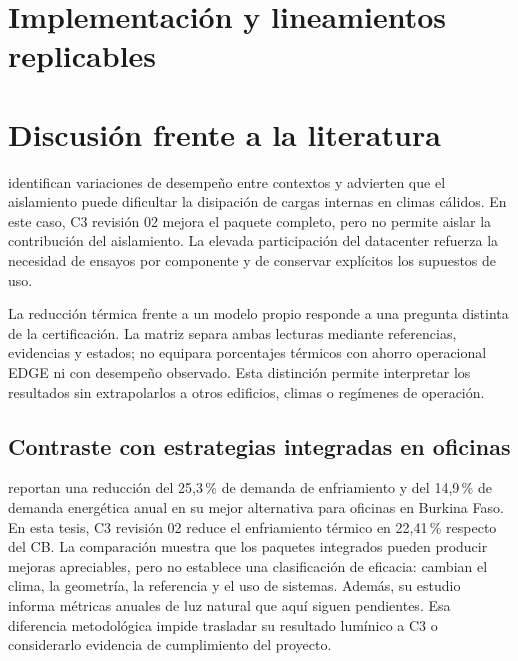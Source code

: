 \section{Implementación y lineamientos replicables}


\section{Discusión frente a la literatura}
\textcite{ribeiroLEEDCertificationBuilding} identifican variaciones de desempeño entre contextos y advierten que el aislamiento puede dificultar la disipación de cargas internas en climas cálidos. En este caso, C3 revisión 02 mejora el paquete completo, pero no permite aislar la contribución del aislamiento. La elevada participación del datacenter refuerza la necesidad de ensayos por componente y de conservar explícitos los supuestos de uso.

La reducción térmica frente a un modelo propio responde a una pregunta distinta de la certificación. La matriz separa ambas lecturas mediante referencias, evidencias y estados; no equipara porcentajes térmicos con ahorro operacional EDGE ni con desempeño observado. Esta distinción permite interpretar los resultados sin extrapolarlos a otros edificios, climas o regímenes de operación.

\subsection{Contraste con estrategias integradas en oficinas}
\textcite{zoureImplementingNaturalVentilation2023a} reportan una reducción del 25,3\,\% de demanda de enfriamiento y del 14,9\,\% de demanda energética anual en su mejor alternativa para oficinas en Burkina Faso. En esta tesis, C3 revisión 02 reduce el enfriamiento térmico en 22,41\,\% respecto del CB. La comparación muestra que los paquetes integrados pueden producir mejoras apreciables, pero no establece una clasificación de eficacia: cambian el clima, la geometría, la referencia y el uso de sistemas. Además, su estudio informa métricas anuales de luz natural que aquí siguen pendientes. Esa diferencia metodológica impide trasladar su resultado lumínico a C3 o considerarlo evidencia de cumplimiento del proyecto.


